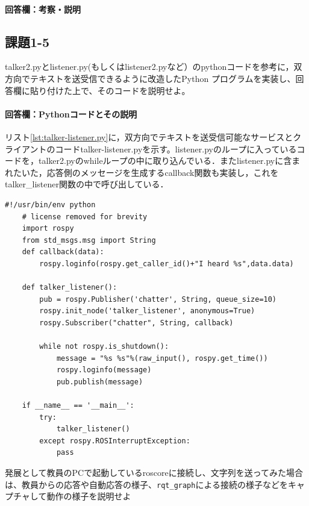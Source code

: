 \documentclass[12pt, xelatex,ja=standard,jafont=hiragino]{bxjsarticle}
\newif\ifdraft
\begin{document}
\paragraph{回答欄：考察・説明}
\ifdraft
考察・説明を詳しく記述する
\verb|rqt_graph|のグラフで2ノード以上のtalker2.pyが動いている様子を示すとわかりやすい
\fi

\subsection{課題1-5}
\begin{screen}
talker2.pyとlistener.py(もしくはlistener2.pyなど）のpythonコードを参考に，双方向でテキストを送受信できるように改造したPython
プログラムを実装し、回答欄に貼り付けた上で、そのコードを説明せよ。   
\end{screen}


\paragraph{回答欄：Pythonコードとその説明}
リスト\ref{lst:talker-listener.py}に，双方向でテキストを送受信可能なサービスとクライアントのコードtalker-listener.pyを示す。listener.pyのループに入っているコードを，talker2.pyのwhileループの中に取り込んでいる．またlistener.pyに含まれたいた，応答側のメッセージを生成するcallback関数も実装し，これをtalker_listener関数の中で呼び出している．

\begin{lstlisting}[caption=talker-listener.pyのコード,label=lst:talker-listener.py]
    #!/usr/bin/env python
    # license removed for brevity
    import rospy
    from std_msgs.msg import String
    def callback(data):
        rospy.loginfo(rospy.get_caller_id()+"I heard %s",data.data)

    def talker_listener():
        pub = rospy.Publisher('chatter', String, queue_size=10)
        rospy.init_node('talker_listener', anonymous=True)
        rospy.Subscriber("chatter", String, callback)

        while not rospy.is_shutdown():
            message = "%s %s"%(raw_input(), rospy.get_time())
            rospy.loginfo(message)
            pub.publish(message)

    if __name__ == '__main__':
        try:
            talker_listener()
        except rospy.ROSInterruptException:
            pass
\end{lstlisting}


\begin{screen}
発展として教員のPCで起動しているroscoreに接続し、文字列を送ってみた場合は、教員からの応答や自動応答の様子、\verb|rqt_graph|による接続の様子などをキャプチャして動作の様子を説明せよ
\end{screen}
\end{document}
